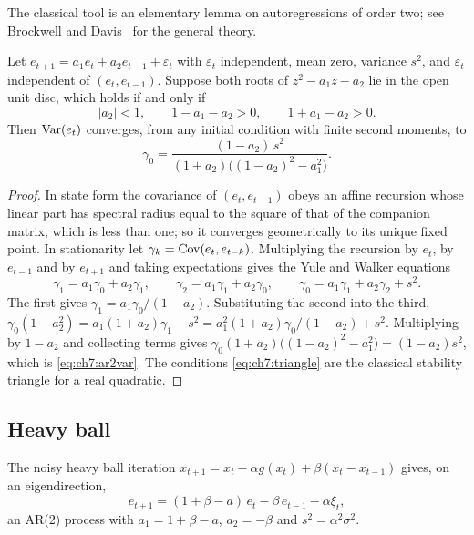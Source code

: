 The classical tool is an elementary lemma on autoregressions of order two;
see Brockwell and Davis~\cite{brockwell1991} for the general theory.

\begin{lemma}\label{lem:ch7:ar2}
Let $e_{t+1}=a_1e_t+a_2e_{t-1}+\varepsilon_t$ with $\varepsilon_t$ independent,
mean zero, variance $s^2$, and $\varepsilon_t$ independent of
$(e_t,e_{t-1})$. Suppose both roots of $z^2-a_1z-a_2$ lie in the open unit
disc, which holds if and only if
\begin{equation}\label{eq:ch7:triangle}
  |a_2|<1,\qquad 1-a_1-a_2>0,\qquad 1+a_1-a_2>0 .
\end{equation}
Then $\operatorname{Var}(e_t)$ converges, from any initial condition with finite second
moments, to
\begin{equation}\label{eq:ch7:ar2var}
  \gamma_0=\frac{(1-a_2)\,s^2}{(1+a_2)\bigl((1-a_2)^2-a_1^2\bigr)} .
\end{equation}
\end{lemma}

\begin{proof}
In state form the covariance of $(e_t,e_{t-1})$ obeys an affine recursion
whose linear part has spectral radius equal to the square of that of the
companion matrix, which is less than one; so it converges geometrically to its
unique fixed point. In stationarity let $\gamma_k=\operatorname{Cov}(e_t,e_{t-k})$.
Multiplying the recursion by $e_t$, by $e_{t-1}$ and by $e_{t+1}$ and taking expectations
gives the Yule and Walker equations
\[
  \gamma_1=a_1\gamma_0+a_2\gamma_1,\qquad
  \gamma_2=a_1\gamma_1+a_2\gamma_0,\qquad
  \gamma_0=a_1\gamma_1+a_2\gamma_2+s^2 .
\]
The first gives $\gamma_1=a_1\gamma_0/(1-a_2)$. Substituting the second into
the third, $\gamma_0(1-a_2^2)=a_1(1+a_2)\gamma_1+s^2
=a_1^2(1+a_2)\gamma_0/(1-a_2)+s^2$. Multiplying by $1-a_2$ and collecting terms
gives $\gamma_0(1+a_2)\bigl((1-a_2)^2-a_1^2\bigr)=(1-a_2)s^2$, which is
\eqref{eq:ch7:ar2var}. The conditions \eqref{eq:ch7:triangle} are the classical
stability triangle for a real quadratic.
\end{proof}

\subsection{Heavy ball}

The noisy heavy ball iteration
$x_{t+1}=x_t-\alpha g(x_t)+\beta(x_t-x_{t-1})$ gives, on an eigendirection,
\begin{equation}\label{eq:ch7:hbrec}
  e_{t+1}=(1+\beta-a)\,e_t-\beta\,e_{t-1}-\alpha\xi_t,
\end{equation}
an AR(2) process with $a_1=1+\beta-a$, $a_2=-\beta$ and $s^2=\alpha^2\sigma^2$.

